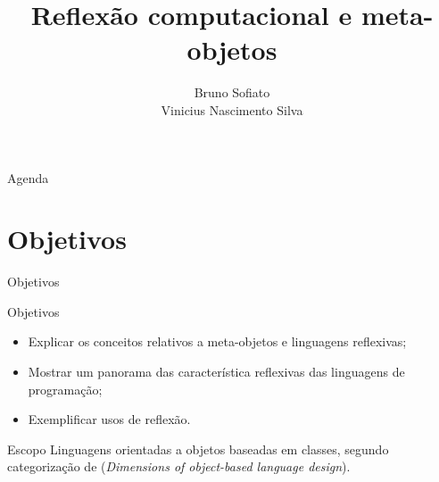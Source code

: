 \documentclass[12pt,t]{beamer}
\institute{POO 2015\\IME -- USP}
\author{Bruno Sofiato\\Vinicius Nascimento Silva}
\title{Reflexão computacional e meta-objetos}
\begin{document}
\abovedisplayskip=0pt
\abovedisplayshortskip=0pt
\belowdisplayskip=0pt
\belowdisplayshortskip=0pt	
 \frame{\titlepage}
 \begin{frame}{Agenda}
	\tableofcontents
 \end{frame}
 \section{Objetivos}
 \begin{frame}{Objetivos}
 	\begin{block}{Objetivos}
 		\begin{itemize}
 			\item Explicar os conceitos relativos a meta-objetos e linguagens reflexivas;
 			\pause
 			\item Mostrar um panorama das característica reflexivas das linguagens de programação;
 			\pause
 			\item Exemplificar usos de reflexão.
 		\end{itemize}
 	\end{block}
 	\pause
 	\begin{block}{Escopo}
 		Linguagens orientadas a objetos baseadas em classes, segundo categorização de  (\emph{Dimensions of object-based language design}).
 	\end{block}
 \end{frame}
\end{document}
